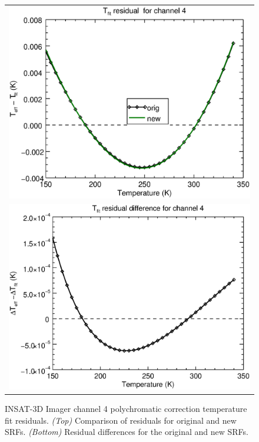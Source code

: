 \begin{figure}[H]
  \centering
  \begin{tabular}{c}
    \includegraphics[scale=0.55]{graphics/imgr/tfit/imgr_insat3d-4.tfit.eps} \\
    \includegraphics[scale=0.55]{graphics/imgr/tfit/imgr_insat3d-4.tfit.difference.eps}
  \end{tabular}
  \caption{INSAT-3D Imager channel 4 polychromatic correction temperature fit residuals. \emph{(Top)} Comparison of residuals for original and new SRFs. \emph{(Bottom)} Residual differences for the original and new SRFs.}
  \label{fig:imgr_ch4_tfit}
\end{figure}


